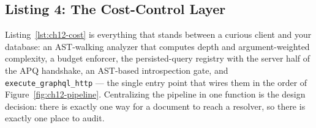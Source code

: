\subsection{Listing 4: The Cost-Control Layer}
\label{subsec:ch12-code-cost}

Listing~\ref{lst:ch12-cost} is everything that stands between a curious
client and your database: an AST-walking analyzer that computes depth and
argument-weighted complexity, a budget enforcer, the persisted-query
registry with the server half of the APQ handshake, an AST-based
introspection gate, and \texttt{execute\_graphql\_http} --- the single
entry point that wires them in the order of
Figure~\ref{fig:ch12-pipeline}. Centralizing the pipeline in one function
is the design decision: there is exactly one way for a document to reach
a resolver, so there is exactly one place to audit.


